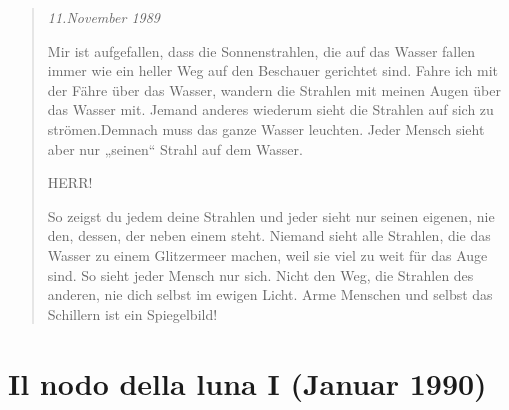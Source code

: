\documentclass[10pt,titlepage,a5paper]{book}
\newenvironment{tg}{\begin{quote}\em}{\end{quote}}
\begin{document}
\begin{tg}
11.November 1989

Mir ist aufgefallen, dass die Sonnenstrahlen, die auf das Wasser fallen immer wie ein heller Weg auf den Beschauer gerichtet sind. Fahre ich mit der Fähre über das Wasser, wandern die Strahlen mit meinen Augen über das Wasser mit. Jemand anderes wiederum sieht die Strahlen auf sich zu strömen.Dem\-nach muss das ganze Wasser leuchten. Jeder Mensch sieht aber nur „seinen“ Strahl auf dem Wasser.

HERR!

So zeigst du jedem deine Strahlen und jeder sieht nur seinen eigenen, nie den, dessen, der neben einem steht. Niemand sieht alle Strahlen, die das Wasser zu einem Glitzermeer machen, weil sie viel zu weit für das Auge sind. So sieht jeder Mensch nur sich. Nicht den Weg, die Strahlen des anderen, nie dich selbst im ewigen Licht. Arme Menschen und selbst das Schillern ist ein Spiegelbild!
\end{tg}


\section*{Il nodo della luna I (Januar 1990)}
\end{document}
